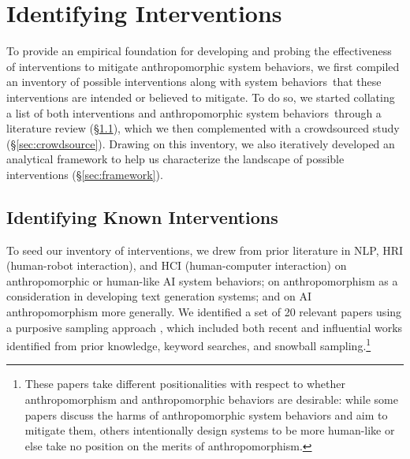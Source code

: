 \documentclass[11pt]{article}
\newcounter{intervention}  %
\newcommand{\cb}{behaviors}
\begin{document}
\section{Identifying Interventions}
\label{methods}

To provide an empirical foundation for developing and probing the effectiveness of interventions to mitigate anthropomorphic system \cb, we first compiled an inventory of possible interventions along with system \cb~that these interventions are intended or believed to mitigate. 
To do so, we started collating a list of both interventions and anthropomorphic system \cb~through a literature review (\S\ref{sec:surv}), which we then complemented with a crowdsourced study (\S\ref{sec:crowdsource}). 
Drawing on this inventory, we also iteratively developed an analytical framework to help us characterize the landscape of possible interventions (\S\ref{sec:framework}). 


\subsection{Identifying Known Interventions}
\label{sec:surv}

To seed our inventory of interventions, we drew from prior literature in NLP, HRI (human-robot interaction), and HCI (human-computer interaction) on anthropomorphic or human-like AI system \cb; on anthropomorphism as a consideration in developing text generation systems; and on AI anthropomorphism more generally. 
We identified a set of 20 relevant papers using a purposive sampling approach \cite{palinkas2015purposeful}, which included both recent and influential works identified from prior knowledge, keyword searches, and snowball sampling.\footnote{These papers take different positionalities with respect to whether anthropomorphism and anthropomorphic behaviors are desirable: while some papers discuss the harms of anthropomorphic system behaviors and aim to mitigate them, others intentionally design systems to be more human-like or else take no position on the merits of anthropomorphism.} 
\end{document}
